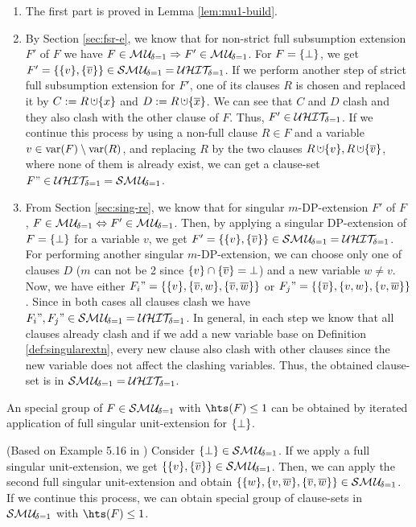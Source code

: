 \documentclass{report}
\begin{document}
\begin{prf}
  \begin{enumerate}
  \item The first part is proved in Lemma \ref{lem:mu1-build}.          
  \item By Section \ref{sec:fsr-e}, we know that for non-strict full subsumption extension $F'$ of $F$ we have $F \in  \mathcal{M\hspace{0.8pt}U}_{\!\delta=1} \Rightarrow F' \in \mathcal{M\hspace{0.8pt}U}_{\!\delta=1}$. For  $F=\{ \bot \}$, we get $F'=\{ \{ v \},\{ \overline v \} \} \in \mathcal{S}\mathcal{M\hspace{0.8pt}U}_{\!\delta=1} = \mathcal{U}\mathcal{HIT}_{\!\!\delta=1}$. If we perform another step of strict full subsumption extension for $F'$, one of its clauses $R$ is chosen and replaced it by $C := R \addcup \set{x}$ and $D := R \addcup \set{\ol{x}}$. We can see that $C$ and $D$ clash and  they also clash with the other clause of $F$. Thus, $F' \in \mathcal{U}\mathcal{HIT}_{\!\!\delta=1}$. If we continue this process by using a non-full clause $R \in F$ and a variable $v \in \operatorname{var}(F) \setminus \operatorname{var}(R)$, and replacing $R$ by the two clauses $R \addcup \set{v}, R \addcup \set{\ol{v}}$, where none of them is already exist, we can get a clause-set $F" \in \mathcal{U}\mathcal{HIT}_{\!\!\delta=1}=\mathcal{S}\mathcal{M\hspace{0.8pt}U}_{\!\delta=1}$.    
  \item From Section \ref{sec:sing-re}, we know that for singular $m$-DP-extension $F'$ of $F$ , $F \in \mathcal{M\hspace{0.8pt}U}_{\!\delta=1} \Leftrightarrow F' \in \mathcal{M\hspace{0.8pt}U}_{\!\delta=1}$. Then, by applying a singular DP-extension of $F=\{ \bot \}$ for a variable $v$, we get $F'=\{ \{ v \},\{ \overline v \} \} \in \mathcal{S}\mathcal{M\hspace{0.8pt}U}_{\!\delta=1} = \mathcal{U}\mathcal{HIT}_{\!\!\delta=1}$. For performing another  singular $m$-DP-extension, we can choose only one of clauses $D$ ($m$ can not be 2 since $\{ v \} \cap \{ \overline v \}=\bot $) and a new variable $w \not = v$. Now, we have either $F_i"=\{ \{ v \},\{ \overline v, w \},\{ \overline v,\overline w \} \}$ or $F_j"=\{ \{ \overline v \},\{  v, w \},\{  v,\overline w \} \}$. Since in both cases all clauses clash we have $F_i",F_j" \in \mathcal{S}\mathcal{M\hspace{0.8pt}U}_{\!\delta=1} = \mathcal{U}\mathcal{HIT}_{\!\!\delta=1}$. In general, in each step we know that all clauses already clash and if we add a new variable base on Definition \ref{def:singularextn}, every new clause also clash with other clauses since the new variable does not affect the clashing variables. Thus, the obtained clause-set is in $\mathcal{S}\mathcal{M\hspace{0.8pt}U}_{\!\delta=1} = \mathcal{U}\mathcal{HIT}_{\!\!\delta=1}$.
  \end{enumerate}
\end{prf}

\begin{lem}\label{lem:mu1-strc}
An special group of $F \in \mathcal{S}\mathcal{M\hspace{0.8pt}U}_{\!\delta=1}$ with $\hts(F) \le 1$ can be obtained by iterated application of full singular unit-extension for $\{ \bot \}$.
\end{lem}
\begin{prf}
(Based on Example 5.16 in \cite{KullmannZhao2010Extremal}) Consider $\{ \bot \} \in \mathcal{S}\mathcal{M\hspace{0.8pt}U}_{\!\delta=1}$. If we apply a full singular unit-extension, we get $\{ \{ v \},\{ \overline{v} \} \} \in \mathcal{S}\mathcal{M\hspace{0.8pt}U}_{\!\delta=1}$. Then, we can apply the second full singular unit-extension and obtain $\{ \{ w \},\{ v,\overline{w} \},\{ \overline{v},\overline{w} \} \}\in \mathcal{S}\mathcal{M\hspace{0.8pt}U}_{\!\delta=1}$. If we continue this process, we can obtain special group of clause-sets in $\mathcal{S}\mathcal{M\hspace{0.8pt}U}_{\!\delta=1}$ with $\hts(F) \le 1$.
\end{prf}
\end{document}
